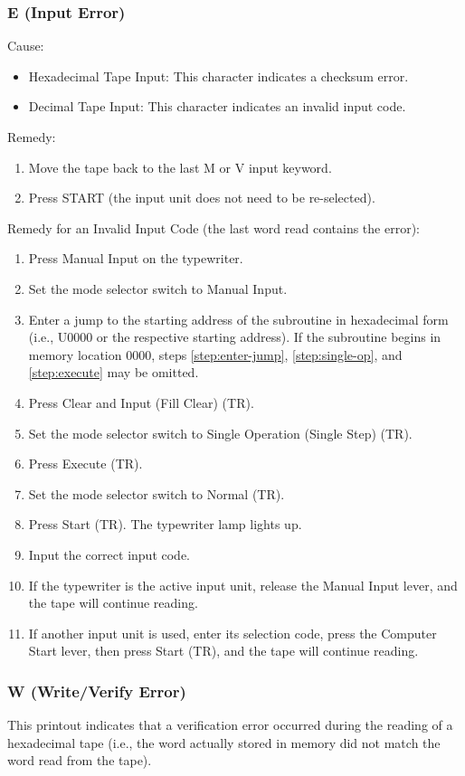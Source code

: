 \documentclass{article}
\begin{document}
\begin{enumerate}
\subsubsection*{E (Input Error)}
Cause:
\begin{itemize}
    \item Hexadecimal Tape Input: This character indicates a checksum error.
    \item Decimal Tape Input: This character indicates an invalid input code.
\end{itemize}
Remedy:
\begin{enumerate}[label=\alph*)]
\item Move the tape back to the last M or V input keyword.
\item Press START (the input unit does not need to be re-selected).
\end{enumerate}
Remedy for an Invalid Input Code (the last word read contains the error):
\begin{enumerate}[label=\alph*)]
\item Press Manual Input on the typewriter.
\item Set the mode selector switch to Manual Input.
\item \label{step:enter-jump} Enter a jump to the starting address of the subroutine in hexadecimal form (i.e., U0000 or the respective starting address). If the subroutine begins in memory location 0000, steps \ref{step:enter-jump}, \ref{step:single-op}, and \ref{step:execute} may be omitted. 
\item Press Clear and Input (Fill Clear) (TR).
\item \label{step:single-op} Set the mode selector switch to Single Operation (Single Step) (TR).
\item \label{step:execute} Press Execute (TR).
\item Set the mode selector switch to Normal (TR).
\item Press Start (TR). The typewriter lamp lights up.
\item Input the correct input code.
\item If the typewriter is the active input unit, release the Manual Input lever, and the tape will continue reading.
\item If another input unit is used, enter its selection code, press the Computer Start lever, then press Start (TR), and the tape will continue reading.
\end{enumerate}

\subsubsection*{W (Write/Verify Error)}
This printout indicates that a verification error occurred during the reading of a hexadecimal tape (i.e., the word actually stored in memory did not match the word read from the tape). 


\end{enumerate}
\end{document}
